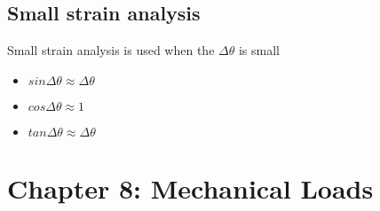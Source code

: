 \documentclass{article}
\begin{document}
    \subsection{Small strain analysis}
    Small strain analysis is used when the $\Delta \theta$ is small
    \begin{itemize}
        \item $sin\Delta\theta\approx\Delta\theta$
        \item $cos\Delta\theta\approx 1$
        \item $tan\Delta\theta\approx\Delta\theta$
    \end{itemize}
    
    \newpage

    \section{Chapter 8: Mechanical Loads}

    
\end{document}
